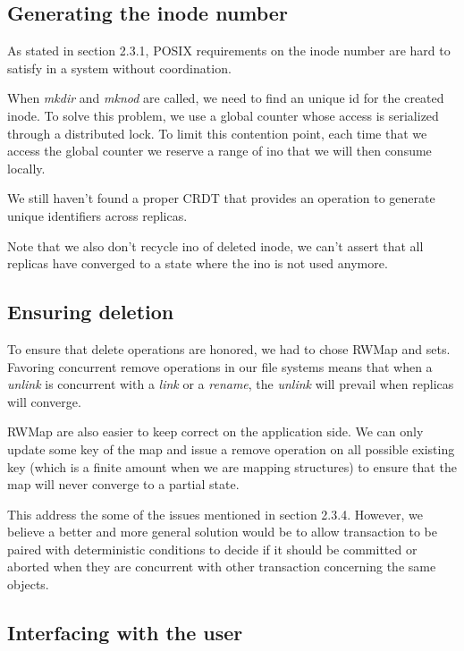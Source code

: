 \documentclass[sigplan, 10pt]{acmart}
\begin{document}
\subsection{Generating the inode number}

As stated in section 2.3.1, POSIX requirements on the inode number are hard to
satisfy in a system without coordination.

When \textit{mkdir} and \textit{mknod} are called, we need to find an unique id
for the created inode. To solve this problem, we use a global
counter whose access is serialized through a distributed lock.
To limit this contention point, each time that we access the global counter
we reserve a range of ino that we will then consume locally.

We still haven't found a proper CRDT that provides an operation to generate
unique identifiers across replicas.

Note that we also don't recycle ino of deleted inode,
we can't assert that all replicas have converged to a state where the ino
is not used anymore.

\subsection{Ensuring deletion}

To ensure that delete operations are honored, we had to chose RWMap and sets.
Favoring concurrent remove operations in our file systems means
that when a \textit{unlink} is concurrent with a \textit{link}
or a \textit{rename}, the \textit{unlink} will prevail
when replicas will converge.

RWMap are also easier to keep correct on the application side. We can only
update some key of the map and issue a remove operation on all possible
existing key (which is a finite amount when we are mapping structures) to ensure
that the map will never converge to a partial state.

This address the some of the issues mentioned in section 2.3.4. However, we
believe a better and more general solution would be to allow transaction to be
paired with deterministic conditions to decide if it should be committed or
aborted when they are concurrent with other transaction concerning the same
objects.

\subsection{Interfacing with the user}
\end{document}
